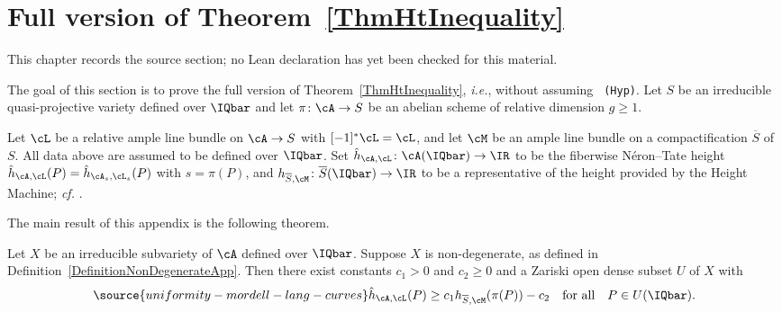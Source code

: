 \chapter{Full version of Theorem~\ref{ThmHtInequality}}
\label{uniformity-mordell-lang-curves-chapter-10}

\begin{remark}
\label{uniformity-mordell-lang-curves-chapter-10-source}
This chapter records the source section; no Lean declaration has yet been checked for this material.
\notready
\end{remark}

\label{AppHtIneqApp}

The goal of this section is to prove the full version of
Theorem~\ref{ThmHtInequality}, \textit{i.e.}, without assuming {\tt
(Hyp)}. Let $S$ be an irreducible quasi-projective variety defined over $\IQbar$ and let $\pi\colon\cA\rightarrow S$ be an abelian scheme of relative dimension $g \ge 1$.


Let $\cL$ be a relative ample line bundle on $\cA \rightarrow S$ with $[-1]^*\cL=\cL$, and
let $\cM$ be an ample line bundle on a compactification $\overline{S}$
of $S$. All data above are assumed to be defined over $\IQbar$. Set
$\hat{h}_{\cA,\cL} \colon \cA(\IQbar) \rightarrow \IR$ to be the
fiberwise N\'{e}ron--Tate height $\hat{h}_{\cA,\cL}(P) =
\hat{h}_{\cA_s,\cL_s}(P)$ with $s = \pi(P)$, and $h_{\overline{S},\cM}
\colon \overline{S}(\IQbar) \rightarrow \IR$ to be a representative of
 the height provided by the Height Machine; \textit{cf.} \cite[Chapter~2 and 9]{BG}.

The main result of this appendix is the following theorem.

\begin{theorem}
\notready\label{ThmHtInequalityFull}
Let $X$ be an irreducible subvariety of $\cA$
defined over $\IQbar$.   Suppose $X$ is non-degenerate,
as defined in Definition~\ref{DefinitionNonDegenerateApp}. Then there
exist constants $c_1>0$ and $c_2\ge 0$ and a Zariski open dense subset
$U$ of $X$ with %
\begin{equation}\label{EqHtInequalityFull}
\source{uniformity-mordell-lang-curves}
\hat{h}_{\cA,\cL}(P) \ge c_1 h_{\overline{S},\cM}( \pi(P) ) - c_2 \quad \text{for all}\quad P \in U(\IQbar).
\end{equation}
\end{theorem}

